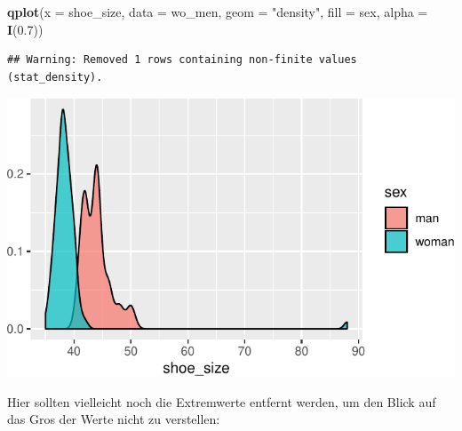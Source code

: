 \documentclass[12pt,ngerman,paper=a4,pagesize,DIV=13]{scrreprt}
\newenvironment{Shaded}{\begin{snugshade}}{\end{snugshade}}
\newcommand{\DataTypeTok}[1]{\textcolor[rgb]{0.13,0.29,0.53}{#1}}
\newcommand{\DecValTok}[1]{\textcolor[rgb]{0.00,0.00,0.81}{#1}}
\newcommand{\FloatTok}[1]{\textcolor[rgb]{0.00,0.00,0.81}{#1}}
\newcommand{\KeywordTok}[1]{\textcolor[rgb]{0.13,0.29,0.53}{\textbf{#1}}}
\newcommand{\NormalTok}[1]{#1}
\newcommand{\OperatorTok}[1]{\textcolor[rgb]{0.81,0.36,0.00}{\textbf{#1}}}
\newcommand{\StringTok}[1]{\textcolor[rgb]{0.31,0.60,0.02}{#1}}
\begin{document}
\begin{Shaded}
\begin{Highlighting}[]
\KeywordTok{qplot}\NormalTok{(}\DataTypeTok{x =}\NormalTok{ shoe_size, }\DataTypeTok{data =}\NormalTok{ wo_men, }\DataTypeTok{geom =} \StringTok{"density"}\NormalTok{, }\DataTypeTok{fill =}\NormalTok{ sex, }
    \DataTypeTok{alpha =} \KeywordTok{I}\NormalTok{(}\FloatTok{0.7}\NormalTok{))}
\end{Highlighting}
\end{Shaded}

\begin{verbatim}
## Warning: Removed 1 rows containing non-finite values (stat_density).
\end{verbatim}

\includegraphics{DatenerhebungStatistik-Uebung_files/figure-latex/unnamed-chunk-242-2.pdf}

Hier sollten vielleicht noch die Extremwerte entfernt werden, um den
Blick auf das Gros der Werte nicht zu verstellen:

\begin{Shaded}
\end{Shaded}
\end{document}
